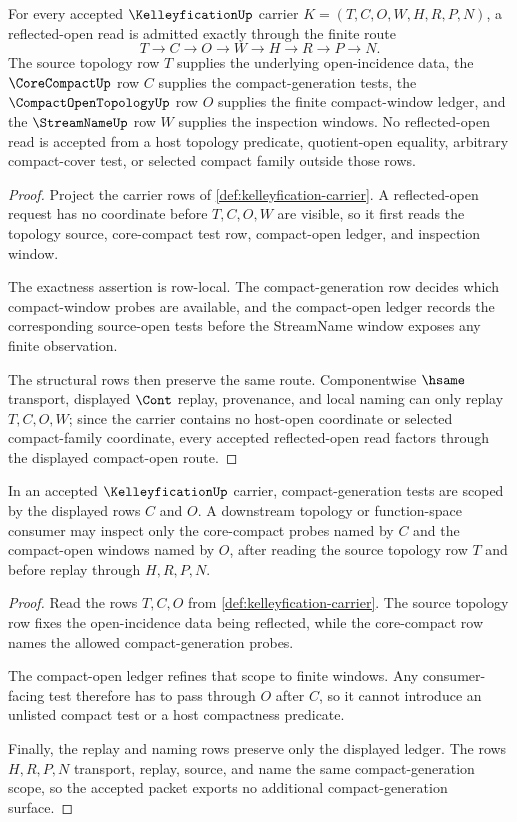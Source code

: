 \begin{theorem}
\label{thm:kelleyfication-compact-open-exactness}
For every accepted $\KelleyficationUp$ carrier $K=(T,C,O,W,H,R,P,N)$, a reflected-open read is admitted exactly through the finite route
$$
T \to C \to O \to W \to H \to R \to P \to N.
$$
The source topology row $T$ supplies the underlying open-incidence data, the $\CoreCompactUp$ row $C$ supplies the compact-generation tests, the $\CompactOpenTopologyUp$ row $O$ supplies the finite compact-window ledger, and the $\StreamNameUp$ row $W$ supplies the inspection windows. No reflected-open read is accepted from a host topology predicate, quotient-open equality, arbitrary compact-cover test, or selected compact family outside those rows.
\end{theorem}
\begin{proof}
Project the carrier rows of \autoref{def:kelleyfication-carrier}. A reflected-open request has no coordinate before $T,C,O,W$ are visible, so it first reads the topology source, core-compact test row, compact-open ledger, and inspection window.

The exactness assertion is row-local. The compact-generation row decides which compact-window probes are available, and the compact-open ledger records the corresponding source-open tests before the StreamName window exposes any finite observation.

The structural rows then preserve the same route. Componentwise $\hsame$ transport, displayed $\Cont$ replay, provenance, and local naming can only replay $T,C,O,W$; since the carrier contains no host-open coordinate or selected compact-family coordinate, every accepted reflected-open read factors through the displayed compact-open route.
\end{proof}

\begin{theorem}
\label{thm:kelleyfication-corecompact-scope}
In an accepted $\KelleyficationUp$ carrier, compact-generation tests are scoped by the displayed rows $C$ and $O$. A downstream topology or function-space consumer may inspect only the core-compact probes named by $C$ and the compact-open windows named by $O$, after reading the source topology row $T$ and before replay through $H,R,P,N$.
\end{theorem}
\begin{proof}
Read the rows $T,C,O$ from \autoref{def:kelleyfication-carrier}. The source topology row fixes the open-incidence data being reflected, while the core-compact row names the allowed compact-generation probes.

The compact-open ledger refines that scope to finite windows. Any consumer-facing test therefore has to pass through $O$ after $C$, so it cannot introduce an unlisted compact test or a host compactness predicate.

Finally, the replay and naming rows preserve only the displayed ledger. The rows $H,R,P,N$ transport, replay, source, and name the same compact-generation scope, so the accepted packet exports no additional compact-generation surface.
\end{proof}

